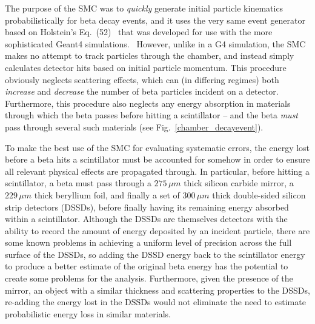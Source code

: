 The purpose of the SMC was to \emph{quickly} generate initial particle kinematics probabilistically for beta decay events, and it uses the very same event generator based on Holstein's Eq.~(52)~\cite{holstein} that was developed for use with the more sophisticated Geant4 simulations.~  However, unlike in a G4 simulation, the SMC makes no attempt to track particles through the chamber, and instead simply calculates detector hits based on initial particle momentum.  This procedure obviously neglects scattering effects, which can (in differing regimes) both \emph{increase} and \emph{decrease} the number of beta particles incident on a detector.  Furthermore, this procedure also neglects any energy absorption in materials through which the beta passes before hitting a scintillator -- and the beta \emph{must} pass through several such materials (see Fig.~\ref{chamber_decayevent}).

To make the best use of the SMC for evaluating systematic errors, the energy lost before a beta hits a scintillator must be accounted for somehow in order to ensure all relevant physical effects are propagated through.  In particular, before hitting a scintillator, a beta must pass through a $275\,\mu m$ thick silicon carbide mirror, a $229\,\mu m$ thick beryllium foil, %
and finally a set of $300\,\mu m$ thick double-sided silicon strip detectors (DSSDs), before finally having its remaining energy absorbed within a scintillator.  Although the DSSDs are themselves detectors with the ability to record the amount of energy deposited by an incident particle, there are some known problems in achieving a uniform level of precision across the full surface of the DSSDs, so adding the DSSD energy back to the scintillator energy to produce a better estimate of the original beta energy has the potential to create some problems for the analysis.  Furthermore, given the presence of the mirror, an object with a similar thickness and scattering properties to the DSSDs, re-adding the energy lost in the DSSDs would not eliminate the need to estimate probabilistic energy loss in similar materials.  


